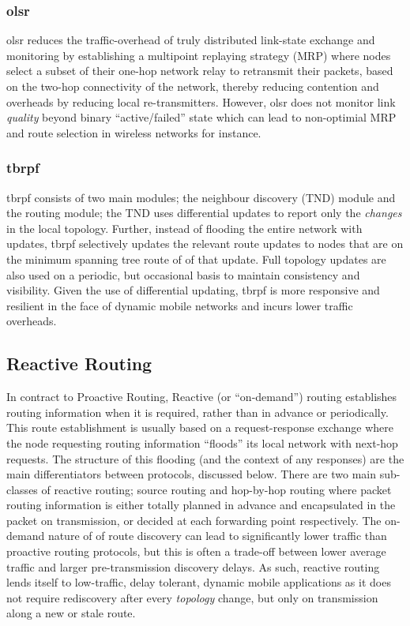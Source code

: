 \subsubsection{\gls{olsr}}
\acrlong{olsr} reduces the traffic-overhead of truly distributed link-state exchange and monitoring by establishing a multipoint replaying strategy (MRP) where nodes select a subset of their one-hop network relay to retransmit their packets, based on the two-hop connectivity of the network, thereby reducing contention and overheads by reducing local re-transmitters. However, \gls{olsr} does not monitor link \emph{quality} beyond binary ``active/failed'' state which can lead to non-optimial MRP and route selection in wireless networks for instance.\\
\subsubsection{\gls{tbrpf}}
\acrlong{tbrpf} consists of two main modules; the neighbour discovery (TND) module and the routing module; the TND uses differential updates to report only the \emph{changes} in the local topology. Further, instead of flooding the entire network with updates, \gls{tbrpf} selectively updates the relevant route updates to nodes that are on the minimum spanning tree route of of that update. Full topology updates are also used on a periodic, but occasional basis to maintain consistency and visibility. Given the use of differential updating, \gls{tbrpf} is more responsive and resilient in the face of dynamic mobile networks and incurs lower traffic overheads.\cite{Bellur1999}\\

\subsection{Reactive Routing}

In contract to Proactive Routing, Reactive (or ``on-demand'') routing establishes routing information when it is required, rather than in advance or periodically.
This route establishment is usually based on a request-response exchange where the node requesting routing information ``floods'' its local network with next-hop requests.
The structure of this flooding (and the context of any responses) are the main differentiators between protocols, discussed below.
There are two main sub-classes of reactive routing; source routing and hop-by-hop routing where packet routing information is either totally planned in advance and encapsulated in the packet on transmission, or decided at each forwarding point respectively.
The on-demand nature of of route discovery can lead to significantly lower traffic than proactive routing protocols, but this is often a trade-off between lower average traffic and larger pre-transmission discovery delays. 
As such, reactive routing lends itself to low-traffic, delay tolerant, dynamic mobile applications as it does not require rediscovery after every \emph{topology} change, but only on transmission along a new or stale route.


